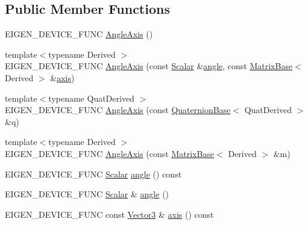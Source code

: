 \subsection*{Public Member Functions}
\begin{DoxyCompactItemize}
\item 
E\+I\+G\+E\+N\+\_\+\+D\+E\+V\+I\+C\+E\+\_\+\+F\+U\+NC \mbox{\hyperlink{class_eigen_1_1_angle_axis_a400d37afcd998d1ee348d37b8bd13778}{Angle\+Axis}} ()
\item 
{\footnotesize template$<$typename Derived $>$ }\\E\+I\+G\+E\+N\+\_\+\+D\+E\+V\+I\+C\+E\+\_\+\+F\+U\+NC \mbox{\hyperlink{class_eigen_1_1_angle_axis_aabac8ee9d467696cddcca18f788a850d}{Angle\+Axis}} (const \mbox{\hyperlink{class_eigen_1_1_angle_axis_acd9b10692d7d726b28670e4d3a282fe8}{Scalar}} \&\mbox{\hyperlink{class_eigen_1_1_angle_axis_a83d3c08a73c111550b7e480d3ed043d4}{angle}}, const \mbox{\hyperlink{class_eigen_1_1_matrix_base}{Matrix\+Base}}$<$ Derived $>$ \&\mbox{\hyperlink{class_eigen_1_1_angle_axis_ae40cc36c8dcd9977e1540d91a80696bb}{axis}})
\item 
{\footnotesize template$<$typename Quat\+Derived $>$ }\\E\+I\+G\+E\+N\+\_\+\+D\+E\+V\+I\+C\+E\+\_\+\+F\+U\+NC \mbox{\hyperlink{class_eigen_1_1_angle_axis_a7a77dfb51ed0877a144d935102866542}{Angle\+Axis}} (const \mbox{\hyperlink{class_eigen_1_1_quaternion_base}{Quaternion\+Base}}$<$ Quat\+Derived $>$ \&q)
\item 
{\footnotesize template$<$typename Derived $>$ }\\E\+I\+G\+E\+N\+\_\+\+D\+E\+V\+I\+C\+E\+\_\+\+F\+U\+NC \mbox{\hyperlink{class_eigen_1_1_angle_axis_aee190c75d9bd91d9148447821635e23d}{Angle\+Axis}} (const \mbox{\hyperlink{class_eigen_1_1_matrix_base}{Matrix\+Base}}$<$ Derived $>$ \&m)
\item 
E\+I\+G\+E\+N\+\_\+\+D\+E\+V\+I\+C\+E\+\_\+\+F\+U\+NC \mbox{\hyperlink{class_eigen_1_1_angle_axis_acd9b10692d7d726b28670e4d3a282fe8}{Scalar}} \mbox{\hyperlink{class_eigen_1_1_angle_axis_a83d3c08a73c111550b7e480d3ed043d4}{angle}} () const
\item 
E\+I\+G\+E\+N\+\_\+\+D\+E\+V\+I\+C\+E\+\_\+\+F\+U\+NC \mbox{\hyperlink{class_eigen_1_1_angle_axis_acd9b10692d7d726b28670e4d3a282fe8}{Scalar}} \& \mbox{\hyperlink{class_eigen_1_1_angle_axis_aff92498ed4ede5ce8978ca330efd7c4f}{angle}} ()
\item 
E\+I\+G\+E\+N\+\_\+\+D\+E\+V\+I\+C\+E\+\_\+\+F\+U\+NC const \mbox{\hyperlink{class_eigen_1_1_matrix}{Vector3}} \& \mbox{\hyperlink{class_eigen_1_1_angle_axis_ae40cc36c8dcd9977e1540d91a80696bb}{axis}} () const

\end{DoxyCompactItemize}
